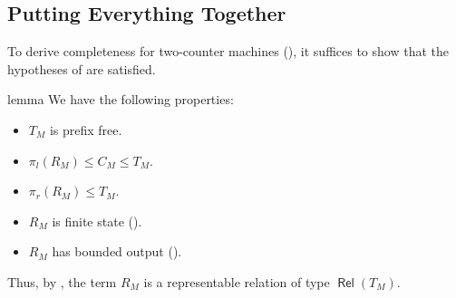 \documentclass[a4paper,UKenglish,cleveref, autoref, thm-restate]{lipics-v2021}
\DeclareMathOperator{\Rel}{\mathsf{Rel}}
\begin{document}
\subsection{Putting Everything Together}
\label{sec:finalizing}

To derive completeness for two-counter machines (), it
suffices to show that the hypotheses of  are
satisfied.

\begin{theoremEnd}[normal]{lemma}
  \label{lem:transition-is-representable}
  We have the following properties:
  \begin{itemize}
  \item $T_M$ is prefix free.
  \item $ \pi _l(R_M)  \leq  C_M  \leq  T_M$.
  \item $ \pi _r(R_M)  \leq  T_M$.
  \item $R_M$ is finite state ().
  \item $R_M$ has bounded output ().
  \end{itemize}
  Thus, by , the term $R_M$ is a
  representable relation of type $\Rel(T_M)$.
\end{theoremEnd}
\end{document}
